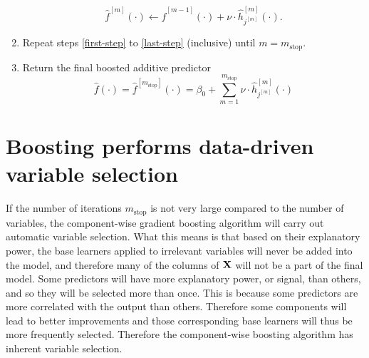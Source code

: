 \begin{algorithm}
\begin{enumerate}
        \begin{equation}
            \hat{f}^{[m]}(\cdot)\gets \hat{f}^{[m-1]}(\cdot)+\nu\cdot \hat{h}_{j^{[m]}}^{[m]}(\cdot).
        \end{equation}
    \item Repeat steps \ref{first-step} to \ref{last-step} (inclusive) until $m=m_{\text{stop}}$.
    \item Return the final boosted additive predictor
        \begin{equation}
            \hat{f}(\cdot)=\hat{f}^{[m_{\text{stop}}]}(\cdot)=\beta_0+\sum_{m=1}^{m_{\text{stop}}}\nu\cdot\hat{h}_{j^{[m]}}^{[m]}(\cdot)
        \end{equation}
\end{enumerate}
\end{algorithm}

\section{Boosting performs data-driven variable selection}
If the number of iterations $m_{\text{stop}}$ is not very large compared to the number of variables, the component-wise gradient boosting algorithm will carry out automatic variable selection. What this means is that based on their explanatory power, the base learners applied to irrelevant variables will never be added into the model, and therefore many of the columns of $\mathbf{X}$ will not be a part of the final model. Some predictors will have more explanatory power, or signal, than others, and so they will be selected more than once. This is because some predictors are more correlated with the output than others. Therefore some components will lead to better improvements and those corresponding base learners will thus be more frequently selected. Therefore the component-wise boosting algorithm has inherent variable selection.

